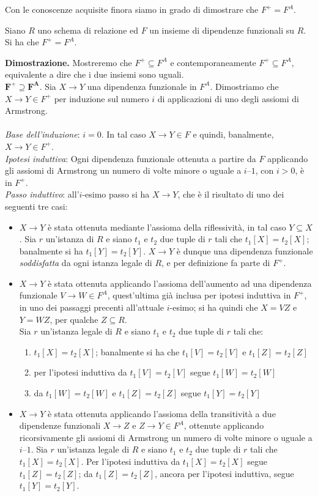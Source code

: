 Con le conoscenze acquisite finora siamo in grado di dimostrare che $F^+ = F^A$.
\label{teorema4_3}
\begin{theo}
Siano $R$ uno schema di relazione ed $F$ un insieme di dipendenze funzionali su $R$. Si ha che $F^+ = F^A$.
\end{theo}
\textbf{Dimostrazione.} Mostreremo che $F^+ \subseteq F^A$ e contemporaneamente $F^+ \subseteq F^A$, equivalente
a dire che i due insiemi sono uguali.\\
$\mathbf{F^{\boldsymbol{+}} \boldsymbol{\supseteq} F^A}$. Sia $X \rightarrow Y$ una dipendenza funzionale in $F^A$.
Dimostriamo che $X\rightarrow Y \in F^+$ per induzione sul numero $i$ di applicazioni di uno degli assiomi di Armstrong.\\\\
\emph{Base dell'induzione}: $i=0$. In tal caso $X \rightarrow Y \in F$ e quindi, banalmente, 
$X \rightarrow Y \in F^+$.\\
\emph{Ipotesi induttiva}: Ogni dipendenza funzionale ottenuta a partire da $F$ applicando gli assiomi di 
Armstrong un numero di volte minore o uguale a $i–1$, con $i>0$, è in $F^+$.\\
\emph{Passo induttivo}: all'$i$-esimo passo si ha $X \rightarrow Y$, che è il risultato di uno dei seguenti 
tre casi:
\begin{itemize}
 \item  $X \rightarrow Y$ è stata ottenuta mediante l'assioma della riflessività, in tal caso $Y \subseteq X$. 
 Sia $r$ un'istanza di $R$ e siano $t_1$ e $t_2$ due tuple di $r$ tali che $t_1[X]=t_2[X]$; banalmente si ha 
 $t_1[Y] = t_2[Y]$. $X \rightarrow Y$ è dunque una dipendenza funzionale \emph{soddisfatta} da ogni istanza legale
 di $R$, e per definizione fa parte di $F^+$.
 \item $X \rightarrow Y$ è stata ottenuta applicando l'assioma dell'aumento ad una dipendenza funzionale 
 $V \rightarrow W \in F^A$, quest'ultima già inclusa per ipotesi induttiva in $F^+$, in uno dei passaggi 
 precenti all'attuale $i$-esimo; si ha quindi che $X = VZ$ e $Y = WZ$, per qualche $Z \subseteq R$.\\
 Sia $r$ un'istanza legale di $R$ e siano $t_1$ e $t_2$ due tuple di $r$ tali che:
 \begin{enumerate}
  \item $t_1[X] = t_2[X]$; banalmente si ha che $t_1[V] = t_2[V]$ e $t_1[Z] = t_2[Z]$
  \item per l'ipotesi induttiva da $t_1[V] = t_2[V]$ segue $t_1[W] = t_2[W]$
  \item da $t_1[W] = t_2[W]$ e $t_1[Z] = t_2[Z]$ segue $t_1[Y] = t_2[Y]$
 \end{enumerate}
\item $X \rightarrow Y$ è stata ottenuta applicando l'assioma della transitività a due dipendenze funzionali 
$X \rightarrow Z$ e $Z \rightarrow Y \in F^A$, ottenute applicando ricorsivamente gli assiomi di Armstrong 
un numero di volte minore o uguale a $i–1$. Sia $r$ un'istanza legale di $R$ e siano $t_1$ e $t_2$ due tuple 
di $r$ tali che $t_1[X] = t_2[X]$. Per l'ipotesi induttiva da $t_1[X] = t_2[X]$ segue $t_1[Z] = t_2[Z]$; da 
$t_1[Z] = t_2[Z]$, ancora per l'ipotesi induttiva, segue $t_1[Y] = t_2[Y]$.
\end{itemize}
